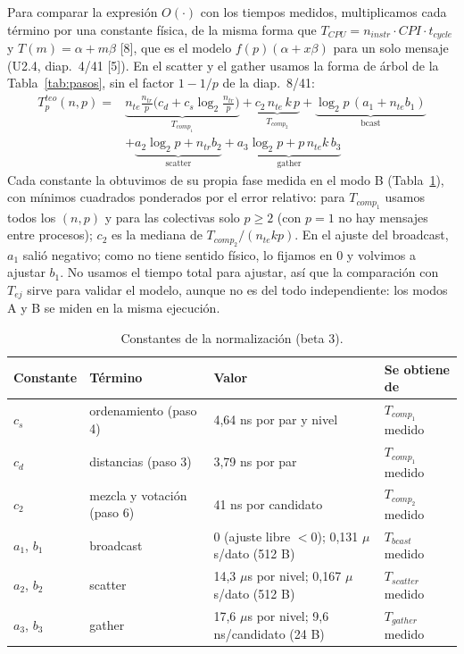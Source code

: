 \documentclass[11pt,a4paper]{article}
\newcommand{\ntr}{n_{tr}}
\newcommand{\nte}{n_{te}}
\begin{document}
Para comparar la expresión $O(\cdot)$ con los tiempos medidos, multiplicamos cada término por una constante física, de la misma forma que $T_{CPU} = n_{instr}\cdot CPI\cdot t_{cycle}$ y $T(m) = \alpha + m\beta$ [8], que es el modelo $f(p)(\alpha + x\beta)$ para un solo mensaje (U2.4, diap.~4/41 [5]). En el scatter y el gather usamos la forma de árbol de la Tabla~\ref{tab:pasos}, sin el factor $1-1/p$ de la diap.~8/41:
\begin{align*}
T_p^{teo}(n,p) = {}& \underbrace{\nte\frac{\ntr}{p}\Big(c_d + c_s\log_2\frac{\ntr}{p}\Big)}_{T_{comp_1}} + \underbrace{c_2\,\nte\,k\,p}_{T_{comp_2}} + \underbrace{\log_2 p\,(a_1 + \nte b_1)}_{\text{bcast}}\\
&+ \underbrace{a_2\log_2 p + \ntr b_2}_{\text{scatter}} + \underbrace{a_3\log_2 p + p\,\nte k\, b_3}_{\text{gather}}
\end{align*}
Cada constante la obtuvimos de su propia fase medida en el modo B (Tabla~\ref{tab:const}), con mínimos cuadrados ponderados por el error relativo: para $T_{comp_1}$ usamos todos los $(n,p)$ y para las colectivas solo $p \ge 2$ (con $p = 1$ no hay mensajes entre procesos); $c_2$ es la mediana de $T_{comp_2}/(\nte k p)$. En el ajuste del broadcast, $a_1$ salió negativo; como no tiene sentido físico, lo fijamos en 0 y volvimos a ajustar $b_1$. No usamos el tiempo total para ajustar, así que la comparación con $T_{ej}$ sirve para validar el modelo, aunque no es del todo independiente: los modos A y B se miden en la misma ejecución.

\begin{table}[!htb]
\centering
\small
\begin{tabular}{llll}
\toprule
\textbf{Constante} & \textbf{Término} & \textbf{Valor} & \textbf{Se obtiene de} \\
\midrule
$c_s$ & ordenamiento (paso 4) & 4,64 ns por par y nivel & $T_{comp_1}$ medido \\
$c_d$ & distancias (paso 3) & 3,79 ns por par & $T_{comp_1}$ medido \\
$c_2$ & mezcla y votación (paso 6) & 41 ns por candidato & $T_{comp_2}$ medido \\
$a_1$, $b_1$ & broadcast & 0 (ajuste libre $<0$); 0,131 $\mu$s/dato (512 B) & $T_{bcast}$ medido \\
$a_2$, $b_2$ & scatter & 14,3 $\mu$s por nivel; 0,167 $\mu$s/dato (512 B) & $T_{scatter}$ medido \\
$a_3$, $b_3$ & gather & 17,6 $\mu$s por nivel; 9,6 ns/candidato (24 B) & $T_{gather}$ medido \\
\bottomrule
\end{tabular}
\caption{Constantes de la normalización (beta 3).}
\label{tab:const}
\end{table}
\end{document}
